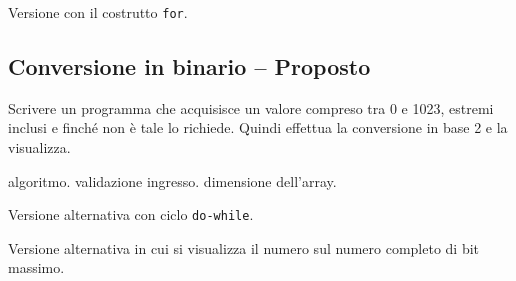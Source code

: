 Versione con il costrutto \texttt{for}.



\prosep{}

\subsection{Conversione in binario -- Proposto}
Scrivere un programma che acquisisce un valore compreso tra 0 e 1023, estremi inclusi e finch\'e non \`e tale lo richiede. Quindi effettua la conversione in base 2 e la visualizza.

\begin{tags}
algoritmo. validazione ingresso. dimensione dell'array.
\end{tags}



Versione alternativa con ciclo \texttt{do-while}.



Versione alternativa in cui si visualizza il numero sul numero completo di bit massimo.




